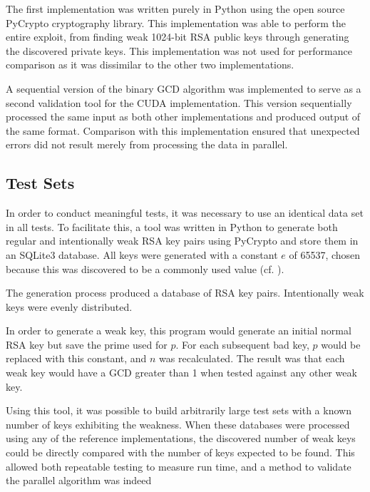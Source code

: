 \documentclass[smallextended]{svjour3}       %
\begin{document}
The first implementation was written purely in Python using the open source
PyCrypto cryptography library. This implementation was able to perform the
entire exploit, from finding weak 1024-bit RSA public keys through generating
the discovered private keys. This implementation was not used for performance
comparison as it was dissimilar to the other two implementations.

A sequential version of the binary GCD algorithm was implemented to serve as a 
second validation tool for the CUDA implementation. This version sequentially 
processed the same input as both other implementations and produced output of
the same format. Comparison with this implementation ensured that unexpected
errors did not result merely from processing the data in parallel.

\subsection{Test Sets}
\label{subsec:testsets}
In order to conduct meaningful tests, it was necessary to use an identical 
data set in all tests. To facilitate this, a tool was written in Python to 
generate both regular and intentionally weak RSA key pairs using PyCrypto and store them in an SQLite3 database. All keys were generated with a 
constant $e$ of 65537, chosen because this was discovered to be a commonly used 
value (cf. \cite{lenstra2012ron}).

The generation process produced a database of RSA key pairs. 
Intentionally weak keys were evenly distributed. 

In order to generate a weak key, this program would generate an initial 
normal RSA key but save the prime used for $p$. For each subsequent bad key, 
$p$ would be replaced with this constant, and $n$ was recalculated. The 
result was that each weak key would have a GCD greater than 1 when 
tested against any other weak key. 

Using this tool, it was possible to build arbitrarily large test sets with a 
known number of keys exhibiting the weakness. When these databases 
were processed using any of the reference implementations, the 
discovered number of weak keys could be directly compared with the 
number of keys expected to be found. This allowed both repeatable testing to 
measure run time, and a method to validate the parallel algorithm was indeed 

\end{document}
